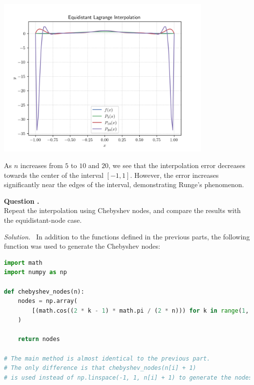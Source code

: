 \documentclass[12pt]{article}
\newcounter{question}
\newcounter{subquest}
\newcommand{\subquestion}{
    \stepcounter{subquest} 
    \vspace{.5em}
    \textbf{\large Question \thequestion.\thesubquest}
    \vspace{.25em}\ \\}
\newcommand{\solution}
    {\par\vspace{0.5em}\noindent\emph{Solution.}\ }
    {\par\vspace{1em}}
\begin{document}
\begin{center}
    \includegraphics[width=0.8\textwidth]{../plots_2/q2_2/all.png}
\end{center}

As $n$ increases from $5$ to $10$ and $20$, we see that the interpolation error decreases towards the center of the interval $[-1,1]$. However, the error increases significantly near the edges of the interval, demonstrating Runge's phenomenon. 

\newpage
\subquestion
Repeat the interpolation using Chebyshev nodes, and compare the results with the equidistant-node case.

\solution
In addition to the functions defined in the previous parts, the following function was used to generate the Chebyshev nodes:
\begin{lstlisting}[language=Python, caption=2.3 Python]
import math
import numpy as np

def chebyshev_nodes(n):
    nodes = np.array(
        [(math.cos((2 * k - 1) * math.pi / (2 * n))) for k in range(1, n + 1)]
    )

    return nodes

# The main method is almost identical to the previous part.
# The only difference is that chebyshev_nodes(n[i] + 1) 
# is used instead of np.linspace(-1, 1, n[i] + 1) to generate the nodes.
\end{lstlisting}
\end{document}
